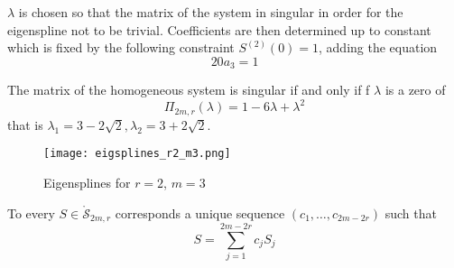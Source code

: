 \begin{enumerate}
      $\lambda$ is chosen so that the matrix of the system in singular in order for the eigenspline not to be trivial.  
      Coefficients are then determined up to constant which is fixed by the following constraint $S^{(2)}(0) = 1$, 
      adding the equation
      \begin{equation*}
       20a_3 = 1
      \end{equation*}
      
      The matrix of the homogeneous system is singular if and only if f $\lambda$ is a zero of \begin{equation*}
       \Pi_{2m, r}(\lambda) = 1-6\lambda+\lambda^2
      \end{equation*}
      that is $\lambda_1 = 3-2\sqrt{2}, \lambda_2 = 3+2\sqrt{2}$.

      \begin{figure}[!h]
	\centering
	\texttt{[image: eigsplines\_r2\_m3.png]}
	\caption{Eigensplines for $r=2$, $m=3$}
      \end{figure}
\end{enumerate}

\begin{prop}
  To every $S \in \mathring{\mathscr{S}}_{2m,r}$ corresponds a unique sequence $(c_1, \ldots, c_{2m-2r})$ such that
  \begin{equation}
    S = \sum_{j=1}^{2m-2r} c_j S_{j}
  \end{equation}
\end{prop}

